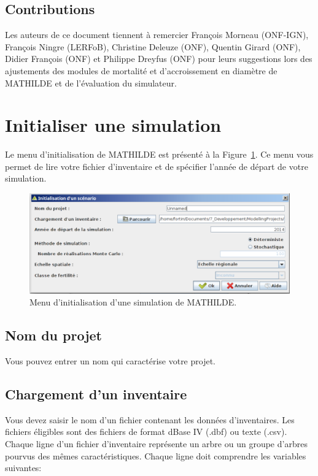 \documentclass[a4paper,12pt]{article}
\begin{document}
\subsection{Contributions}

Les auteurs de ce document tiennent à remercier François Morneau (ONF-IGN), François Ningre (LERFoB), Christine Deleuze (ONF), Quentin Girard (ONF), Didier François (ONF) et Philippe Dreyfus (ONF) pour leurs suggestions lors des ajustements des modules de mortalité et d'accroissement en diamètre de MATHILDE et de l'évaluation du simulateur. 

\section{Initialiser une simulation}

Le menu d'initialisation de MATHILDE est présenté à la Figure~\ref{figureInitialMenu}. Ce menu vous permet de lire votre fichier d'inventaire et de spécifier l'année de départ de votre simulation.

\begin{figure}[h]
\begin{center}
\includegraphics[width=\textwidth]{./figures/initialMenu_fr}
\caption{Menu d'initialisation d'une simulation de MATHILDE.}
\label{figureInitialMenu}
\end{center}
\end{figure}


\subsection{Nom du projet}

Vous pouvez entrer un nom qui caractérise votre projet. 

\subsection{Chargement d'un inventaire}
Vous devez saisir le nom d'un fichier contenant les données d'inventaires. Les fichiers éligibles sont des fichiers de format dBase IV (.dbf) ou texte (.csv). Chaque ligne d'un fichier d'inventaire représente un arbre ou un groupe d'arbres pourvus des mêmes caractéristiques. Chaque ligne doit comprendre les variables suivantes:
\end{document}
